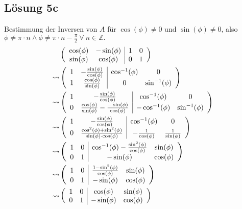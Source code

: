 \documentclass[main.tex]{subfiles}
\begin{document}
\subsection{Lösung 5c}
Bestimmung der Inversen von $A$ für $\cos (\phi) \neq 0$ und $\sin (\phi) \neq 0$, also $\phi \neq \pi \cdot n \wedge  \phi \neq \pi \cdot n - \frac{\pi}{2}\ \forall\ n \in \mathbb{Z}.$
\begin{align*}
    & \eqmatrix{cc|cc}{
        \cos (\phi) & -\sin (\phi) &  1 & 0 \\
        \sin (\phi) &  \cos (\phi) &  0 & 1 \\
    }\\
    \leadsto & \eqmatrix{cc|cc}{
        1 & -\frac{\sin (\phi)}{\cos (\phi)} &  \cos^{-1} (\phi) & 0 \\
        1 &  \frac{\cos (\phi)}{\sin (\phi)} &  0 & \sin^{-1} (\phi) \\
    }\\
    \leadsto & \eqmatrix{cc|cc}{
        1 & -\frac{\sin (\phi)}{\cos (\phi)}                                 &  \cos^{-1} (\phi)   & 0 \\
        0 & \frac{\cos (\phi)}{\sin (\phi)}-\frac{-\sin (\phi)}{\cos (\phi)} &  - \cos^{-1} (\phi) & \sin^{-1} (\phi) \\
    }\\
    \leadsto & \eqmatrix{cc|cc}{
        1 & -\frac{\sin (\phi)}{\cos (\phi)} &  \cos^{-1} (\phi) & 0 \\
        0 & \frac{\cos^2 (\phi) + \sin^2 (\phi)}{\sin (\phi) \cdot \cos (\phi)} & -\frac{1}{\cos (\phi)} & \frac{1}{\sin (\phi)} \\
    }\\
    \leadsto & \eqmatrix{cc|cc}{
        1 & 0 & \cos^{-1} (\phi) - \frac{\sin^2 (\phi)}{\cos (\phi)} & \sin (\phi) \\
        0 & 1 & -\sin (\phi)            & \cos (\phi) \\
    }\\
    \leadsto & \eqmatrix{cc|cc}{
        1 & 0 & \frac{1 - \sin^2 (\phi)}{\cos (\phi)} & \sin (\phi) \\
        0 & 1 & -\sin (\phi)                          & \cos (\phi) \\
    }\\
    \leadsto & \eqmatrix{cc|cc}{
        1 & 0 &  \cos (\phi) & \sin (\phi) \\
        0 & 1 & -\sin (\phi) & \cos (\phi) \\
    }\\
\end{align*}
\end{document}
